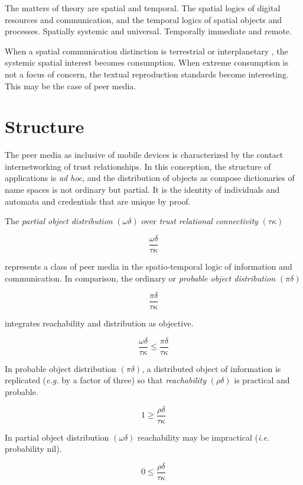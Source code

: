 \documentclass[12pt,twocolumn]{article}
\begin{document}
The matters of theory are spatial and temporal.  The spatial logics of
digital resources and communication, and the temporal logics of
spatial objects and processes.  Spatially systemic and universal.
Temporally immediate and remote.

When a spatial communication distinction is terrestrial or
interplanetary \cite{RFC5050}, the systemic spatial interest becomes
consumption.  When extreme consumption is not a focus of concern, the
textual reproduction standards become interesting.  This may be the
case of peer media.

\section{Structure}

The peer media as inclusive of mobile devices is characterized by the
contact internetworking of trust relationships.  In this conception,
the structure of applications is {\it ad hoc}, and the distribution of
objects as compose dictionaries of name spaces is not ordinary but
partial.  It is the identity of individuals and automata and
credentials that are unique by proof.

The {\it partial object distribution} \((\omega\delta)\) over {\it trust relational connectivity} \((\tau\kappa)\) 

 $$
 \frac{\omega\delta}{\tau\kappa}
 $$

represents a class of peer media in the spatio-temporal logic of
information and communication.  In comparison, the ordinary or {\it
  probable object distribution} \((\pi\delta)\)

 $$
 \frac{\pi\delta}{\tau\kappa}
 $$

integrates reachability and distribution as objective.

 $$
 \frac{\omega\delta}{\tau\kappa} \le \frac{\pi\delta}{\tau\kappa}
 $$

In probable object distribution \((\pi\delta)\), a distributed object
of information is replicated ({\it e.g.} by a factor of three) so that
{\it reachability} \((\rho\delta)\) is practical and probable.

 $$
 1 \ge \frac{\rho\delta}{\tau\kappa}
 $$

In partial object distribution \((\omega\delta)\) reachability may be
impractical ({\it i.e.} probability nil).

 $$
 0 \le \frac{\rho\delta}{\tau\kappa}
 $$



\appendix




\end{document}
